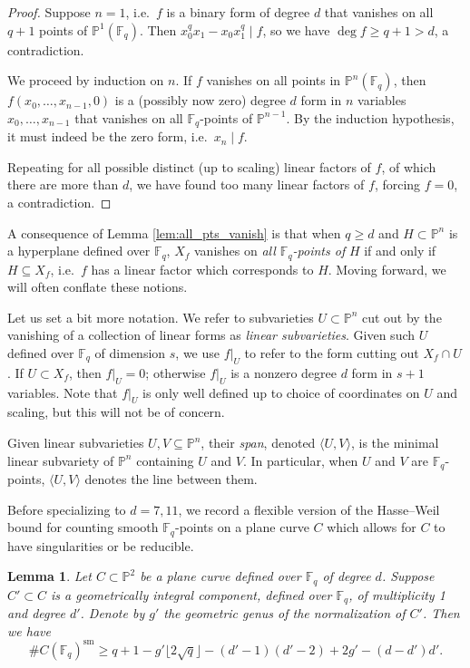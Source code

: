 \documentclass{amsart}
\newcommand{\F}{\mathbb{F}}
\renewcommand{\P}{\mathbb{P}}
\newcommand{\Span}[1]{\langle #1 \rangle}
\newcommand{\sm}{\mathrm{sm}}
\newtheorem{lemma}[theorem]{Lemma}
\theoremstyle{definition}
\numberwithin{equation}{section}
\numberwithin{table}{section}
\newcommand{\qboundgeq}[1]{{\color{cyan}$q \geq {#1}$}}
\renewcommand{\qboundgeq}[1]{{$q \geq {#1}$}}
\begin{document}
\begin{proof}
	Suppose $n=1$, i.e.\ $f$ is a binary form of degree $d$ that vanishes on all $q+1$ points of $\P^1(\F_q)$. Then $x_0^qx_1 - x_0x_1^q \mid f$, so we have $\deg f \geq q+1 > d$, a contradiction.
	
	We proceed by induction on $n$. If $f$ vanishes on all points in $\P^n(\F_q)$, then $f(x_0, \ldots, x_{n-1},0)$ is a (possibly now zero) degree $d$ form in $n$ variables $x_0,\ldots,x_{n-1}$ that vanishes on all $\F_q$-points of $\P^{n-1}$. By the induction hypothesis, it must indeed be the zero form, i.e.\ $x_n \mid f$.
	
	Repeating for all possible distinct (up to scaling) linear factors of $f$, of which there are more than $d$, we have found too many linear factors of $f$, forcing $f=0$, a contradiction.
\end{proof}

A consequence of Lemma \ref{lem:all_pts_vanish} is that when \qboundgeq{d} and $H \subset \P^n$ is a hyperplane defined over $\F_q$, $X_f$ vanishes on \textit{all $\F_q$-points of} $H$ if and only if $H \subseteq X_f$, i.e.\ $f$ has a linear factor which corresponds to $H$. Moving forward, we will often conflate these notions. 

Let us set a bit more notation. We refer to subvarieties $U \subset \P^n$ cut out by the vanishing of a collection of linear forms as \textit{linear subvarieties}. Given such $U$ defined over $\F_q$ of dimension $s$, we use $f|_U$ to refer to the form cutting out $X_f \cap U$. If $U \subset X_f$, then $f|_U = 0$; otherwise $f|_U$ is a nonzero degree $d$ form in $s+1$ variables. Note that $f|_U$ is only well defined up to choice of coordinates on $U$ and scaling, but this will not be of concern. 

Given linear subvarieties $U,V \subseteq \P^n$, their \textit{span}, denoted $\Span{U,V}$, is the minimal linear subvariety of $\P^n$ containing $U$ and $V$. In particular, when $U$ and $V$ are $\F_q$-points, $\Span{U,V}$ denotes the line between them.

Before specializing to $d=7,11$, we record a flexible version of the Hasse--Weil bound for counting smooth $\F_q$-points on a plane curve $C$ which allows for $C$ to have singularities or be reducible.

\begin{lemma}
\label{lem:finding_sm_pt}
    Let $C \subset \P^2$ be a plane curve defined over $\F_q$ of degree $d$. Suppose $C' \subset C$ is a geometrically integral component, defined over $\F_q$, of multiplicity 1 and degree $d'$. Denote by $g'$ the geometric genus of the normalization of $C'$. Then we have
    \begin{equation}\label{eq:ns_pt_bound}
        \#C(\F_q)^{\sm} \geq q+1 - g' \lfloor 2\sqrt{q} \rfloor - (d'-1)(d'-2) + 2g' - (d-d')d'.
    \end{equation}
\end{lemma}
\end{document}
